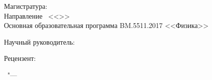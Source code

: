 \vspace{0pt plus1fill} %
\begin{center}%
	\textbf {\large %
		\thesisTitle}


\vspace{0pt plus2fill} %
{%
Магистратура:\\
Направление \thesisSpecialtyNumber\ <<\thesisSpecialtyTitle>>\\
Основная образовательная программа BM.5511.2017 <<Физика>>
}

\vspace{0pt plus2fill} %

\end{center}%
%
\vspace{0pt plus4fill} %
\begin{flushright}%
Научный руководитель:




\supervisorRegalia

\supervisorFio
\end{flushright}%

\begin{flushright}%
Рецензент:
	
\opponentOneRegalia
	
\opponentOneFio
\end{flushright}%
%
\vspace{0pt plus4fill} %
\begin{center}%
{\thesisCity\ "--- \thesisYear}
\end{center}%
\newpage
